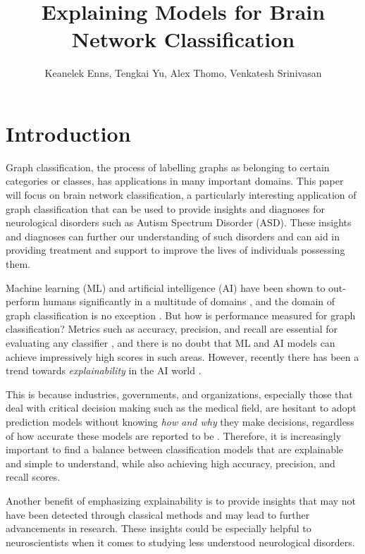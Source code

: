 \documentclass[letterpaper]{article}
\author{
Keanelek Enns, Tengkai Yu, Alex Thomo, Venkatesh Srinivasan\\
}
\title{Explaining Models for Brain Network Classification}
\begin{document}
\maketitle

\begin{abstract}

\end{abstract}

\section{Introduction}

Graph classification, the process of labelling graphs as belonging to certain categories or classes, has applications in many important domains.
This paper will focus on brain network classification, a particularly interesting application of graph classification that can be used to provide insights and diagnoses for neurological disorders such as Autism Spectrum Disorder (ASD).
These insights and diagnoses can further our understanding of such disorders and can aid in providing treatment and support to improve the lives of individuals possessing them.

Machine learning (ML) and artificial intelligence (AI) have been shown to out-perform humans significantly in a multitude of domains \cite{grace2018,fogel2018,brzezicki2020,kahng2021}, and the domain of graph classification is no exception \cite{kong2019}.
But how is performance measured for graph classification?
Metrics such as accuracy, precision, and recall are essential for evaluating any classifier \cite{elkan2012}, and there is no doubt that ML and AI models can achieve impressively high scores in such areas.
However, recently there has been a trend towards \emph{explainability} in the AI world \cite{hassan2021,linardatos2020}.

This is because industries, governments, and organizations, especially those that deal with critical decision making such as the medical field, are hesitant to adopt prediction models without knowing \emph{how and why} they make decisions, regardless of how accurate these models are reported to be \cite{asan2020}.
Therefore, it is increasingly important to find a balance between classification models that are explainable and simple to understand, while also achieving high accuracy, precision, and recall scores.

Another benefit of emphasizing explainability is to provide insights that may not have been detected through classical methods and may lead to further advancements in research.
These insights could be especially helpful to neuroscientists when it comes to studying less understood neurological disorders.
\end{document}
